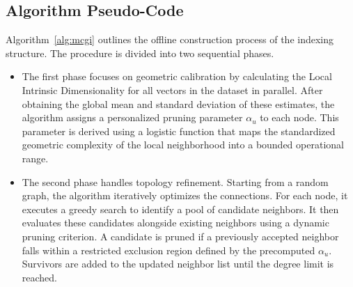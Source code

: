 \documentclass{article}
\theoremstyle{plain}
\theoremstyle{definition}
\theoremstyle{remark}
\begin{document}
\subsection{Algorithm Pseudo-Code}
\label{appendix:alg}

Algorithm~\ref{alg:mcgi} outlines the offline construction process of the indexing structure. The procedure is divided into two sequential phases. 
\begin{itemize}
    \item The first phase focuses on geometric calibration by calculating the Local Intrinsic Dimensionality for all vectors in the dataset in parallel. After obtaining the global mean and standard deviation of these estimates, the algorithm assigns a personalized pruning parameter $\alpha_u$ to each node. This parameter is derived using a logistic function that maps the standardized geometric complexity of the local neighborhood into a bounded operational range. 
    \item The second phase handles topology refinement. Starting from a random graph, the algorithm iteratively optimizes the connections. For each node, it executes a greedy search to identify a pool of candidate neighbors. It then evaluates these candidates alongside existing neighbors using a dynamic pruning criterion. A candidate is pruned if a previously accepted neighbor falls within a restricted exclusion region defined by the precomputed $\alpha_u$. Survivors are added to the updated neighbor list until the degree limit is reached.
\end{itemize}
\end{document}
